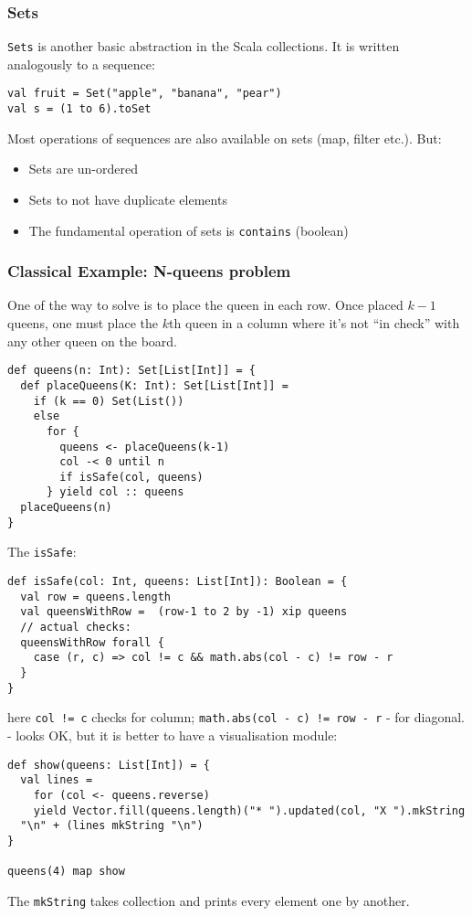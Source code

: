 \documentclass{scrartcl}
\newcommand{\term}[1]{\verb~#1~} %
\begin{document}
\subsubsection{Sets}
\label{sec:FunctionsAsObjects}

\term{Sets} is another basic abstraction in the Scala collections. It is written
analogously to a sequence:
\begin{lstlisting}
val fruit = Set("apple", "banana", "pear")
val s = (1 to 6).toSet
\end{lstlisting}
Most operations of sequences are also available on sets (map, filter etc.). But:
\begin{itemize}
\item Sets are un-ordered
\item Sets to not have duplicate elements
\item The fundamental operation of sets is \lstinline|contains| (boolean)
\end{itemize}

\subsubsection{Classical Example: N-queens problem}
\label{sec:NQueensProblem}

One of the way to solve is to place the queen in each row. Once placed $k-1$
queens, one must place the $k$th queen in a column where it's not ``in check''
with any other queen on the board.
\begin{lstlisting}
def queens(n: Int): Set[List[Int]] = {
  def placeQueens(K: Int): Set[List[Int]] =
    if (k == 0) Set(List())
    else
      for {
        queens <- placeQueens(k-1)
        col -< 0 until n
        if isSafe(col, queens)
      } yield col :: queens
  placeQueens(n)
}
\end{lstlisting}
The \lstinline|isSafe|:
\begin{lstlisting}
def isSafe(col: Int, queens: List[Int]): Boolean = {
  val row = queens.length
  val queensWithRow =  (row-1 to 2 by -1) xip queens
  // actual checks:
  queensWithRow forall {
    case (r, c) => col != c && math.abs(col - c) != row - r
  }
}
\end{lstlisting}

here \lstinline|col != c| checks for column;
\lstinline|math.abs(col - c) != row - r| - for diagonal.
- looks OK, but it is better to have a visualisation module:
\begin{lstlisting}
def show(queens: List[Int]) = {
  val lines =
    for (col <- queens.reverse)
    yield Vector.fill(queens.length)("* ").updated(col, "X ").mkString
  "\n" + (lines mkString "\n")
}

queens(4) map show
\end{lstlisting}
The \lstinline|mkString| takes collection and prints every element one by
another.
\end{document}
